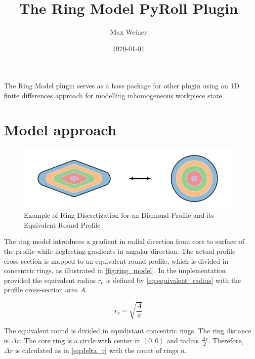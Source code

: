 \documentclass[11pt]{PyRollDocs}
\begin{document}
    \title{The Ring Model PyRoll Plugin}
    \author{Max Weiner}
    \date{\today}

    \maketitle

    The Ring Model plugin serves as a base package for other plugin using an 1D finite differences approach for modelling inhomogeneous workpiece state.


    \section{Model approach}\label{sec:model-approach}

    \begin{figure}
        \centering
        \includegraphics[width=\linewidth]{img/ring_model}
        \caption{Example of Ring Discretization for an Diamond Profile and its Equivalent Round Profile}
        \label{fig:ring_model}
    \end{figure}

    The ring model introduces a gradient in radial direction from core to surface of the profile while neglecting gradients in angular direction.
    The actual profile cross-section is mapped to an equivalent round profile, which is divided in concentric rings, as illustrated in \autoref{fig:ring_model}.
    In the implementation provided the equivalent radius $r_\mathrm{e}$ is defined by \autoref{eq:equivalent_radius} with the profile cross-section area $A$.

    \begin{equation}
        r_{\mathrm{e}} = \sqrt{\frac{A}{\pi}}
        \label{eq:equivalent_radius}
    \end{equation}

    The equivalent round is divided in equidistant concentric rings.
    The ring distance is $\Delta r$.
    The core ring is a circle with center in $(0,0)$ and radius $\frac{\Delta r}{2}$.
    Therefore, $\Delta r$ is calculated as in \autoref{eq:delta_r} with the count of rings $n$.
\end{document}
